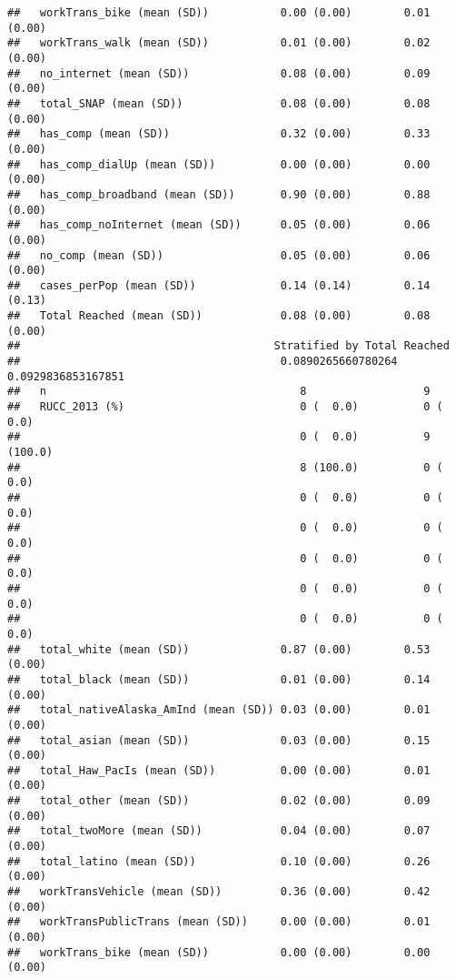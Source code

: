 \documentclass[
]{article}
\begin{document}
\begin{verbatim}
##   workTrans_bike (mean (SD))           0.00 (0.00)        0.01 (0.00)      
##   workTrans_walk (mean (SD))           0.01 (0.00)        0.02 (0.00)      
##   no_internet (mean (SD))              0.08 (0.00)        0.09 (0.00)      
##   total_SNAP (mean (SD))               0.08 (0.00)        0.08 (0.00)      
##   has_comp (mean (SD))                 0.32 (0.00)        0.33 (0.00)      
##   has_comp_dialUp (mean (SD))          0.00 (0.00)        0.00 (0.00)      
##   has_comp_broadband (mean (SD))       0.90 (0.00)        0.88 (0.00)      
##   has_comp_noInternet (mean (SD))      0.05 (0.00)        0.06 (0.00)      
##   no_comp (mean (SD))                  0.05 (0.00)        0.06 (0.00)      
##   cases_perPop (mean (SD))             0.14 (0.14)        0.14 (0.13)      
##   Total Reached (mean (SD))            0.08 (0.00)        0.08 (0.00)      
##                                       Stratified by Total Reached
##                                        0.0890265660780264 0.0929836853167851
##   n                                       8                  9              
##   RUCC_2013 (%)                           0 (  0.0)          0 (  0.0)      
##                                           0 (  0.0)          9 (100.0)      
##                                           8 (100.0)          0 (  0.0)      
##                                           0 (  0.0)          0 (  0.0)      
##                                           0 (  0.0)          0 (  0.0)      
##                                           0 (  0.0)          0 (  0.0)      
##                                           0 (  0.0)          0 (  0.0)      
##                                           0 (  0.0)          0 (  0.0)      
##   total_white (mean (SD))              0.87 (0.00)        0.53 (0.00)       
##   total_black (mean (SD))              0.01 (0.00)        0.14 (0.00)       
##   total_nativeAlaska_AmInd (mean (SD)) 0.03 (0.00)        0.01 (0.00)       
##   total_asian (mean (SD))              0.03 (0.00)        0.15 (0.00)       
##   total_Haw_PacIs (mean (SD))          0.00 (0.00)        0.01 (0.00)       
##   total_other (mean (SD))              0.02 (0.00)        0.09 (0.00)       
##   total_twoMore (mean (SD))            0.04 (0.00)        0.07 (0.00)       
##   total_latino (mean (SD))             0.10 (0.00)        0.26 (0.00)       
##   workTransVehicle (mean (SD))         0.36 (0.00)        0.42 (0.00)       
##   workTransPublicTrans (mean (SD))     0.00 (0.00)        0.01 (0.00)       
##   workTrans_bike (mean (SD))           0.00 (0.00)        0.00 (0.00)       

\end{verbatim}
\end{document}
